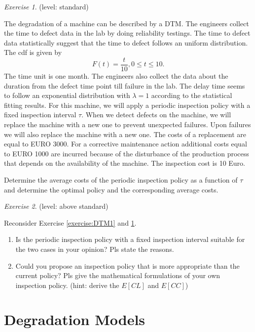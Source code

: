 \documentclass[10pt,a4paper]{article}
\theoremstyle{remark}
\newtheorem{exercise}{Exercise}
\begin{document}
\begin{exercise} \label{exercise:DTM2}
(level: standard)

The degradation of a machine can be described by a DTM. The engineers collect the time to defect data in the lab by doing reliability testings. The time to defect data statistically suggest that the time to defect follows an uniform distribution. The cdf is given by
\begin{equation*}
F(t)=\dfrac{t}{10}, 0\leq t\leq 10.
\end{equation*} 
The time unit is one month. The engineers also collect the data about the duration from the defect time point till failure in the lab. The delay time seems to follow an exponential distribution with $\lambda=1$ according to the statistical fitting results.  
For this machine, we will apply a periodic inspection policy with a fixed inspection interval $\tau$. When we detect defects on the machine, we will replace the machine with a new one to prevent unexpected failures. Upon failures we will also replace the machine with a new one. The costs of a replacement are equal to EURO 3000. For a corrective maintenance
action additional costs equal to EURO 1000 are incurred because of the disturbance of the production process that depends on the availability of the machine. The inspection cost is 10 Euro.

Determine the average costs of the periodic inspection policy as a function of $\tau$ and determine the optimal policy and the corresponding average costs.
\end{exercise}

\begin{exercise}
(level: above standard)

Reconsider Exercise \ref{exercise:DTM1} and \ref{exercise:DTM2}. 
\begin{enumerate}
\item Is the periodic inspection policy with a fixed inspection interval suitable for the two cases in your opinion? Pls state the reasons.
\item Could you propose an inspection policy that is more appropriate than the current policy? Pls give the mathematical formulations of your own inspection policy. (hint: derive the $E[CL]$ and $E[CC]$)
\end{enumerate}

\end{exercise}


\section{Degradation Models}
\end{document}
